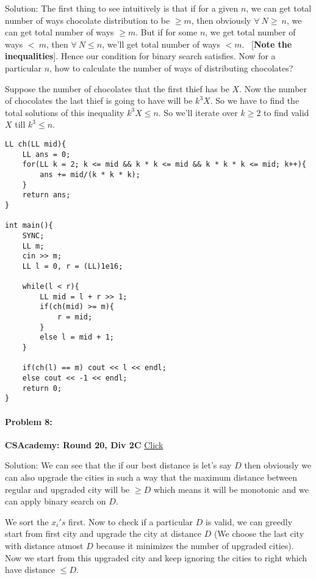 \documentclass[12pt]{article}
\begin{document}
\begin{large}
Solution: The first thing to see intuitively is that if for a given $n$, we can get total number of ways chocolate distribution to be $\geq m$, then obviously $\forall\ N\geq\ n$, we can get total number of ways $\geq m$. But if for some $n$, we get total number of ways $<\ m$, then $\forall\ N \leq n$, we'll get total number of ways $<m$. \ [\textbf{Note the inequalities}]. Hence our condition for binary search satisfies. Now for a particular $n$, how to calculate the number of ways of distributing chocolates?

Suppose the number of chocolates that the first thief has be $X$. Now the number of chocolates the last thief is going to have will be $k^{3}X$. So we have to find the total solutions of this inequality $k^{3}X \leq n$. So we'll iterate over $k \geq 2$ to find valid $X$ till $k^{3} \leq n$. 

\begin{verbatim}
LL ch(LL mid){
	LL ans = 0; 
	for(LL k = 2; k <= mid && k * k <= mid && k * k * k <= mid; k++){
		ans += mid/(k * k * k); 
	}
	return ans; 
}

int main(){
	SYNC; 
	LL m; 
	cin >> m;
	LL l = 0, r = (LL)1e16;
	
	while(l < r){
		LL mid = l + r >> 1; 
		if(ch(mid) >= m){
			r = mid; 
		}
		else l = mid + 1; 
	}

	if(ch(l) == m) cout << l << endl; 
	else cout << -1 << endl; 
	return 0; 
}
\end{verbatim} 

\paragraph{\large Problem 8:}\textbf{CSAcademy: Round 20, Div 2C} \href{https://csacademy.com/contest/round-20/#task/city-upgrades}{Click}

Solution: We can see that the if our best distance is let's say $D$ then obviously we can also upgrade the cities in such a way that the maximum distance between regular and upgraded city will be $\geq D$ which means it will be monotonic and we can apply binary search on $D$.
 
We sort the $x_{i}'s$ first.
Now to check if a particular $D$ is valid, we can greedly start from first city and upgrade the city at distance $D$ (We choose the last city with distance atmost $D$ because it minimizes the number of upgraded cities). Now we start from this upgraded city and keep ignoring the cities to right which have distance $\leq D$.


\end{large}
\end{document}
